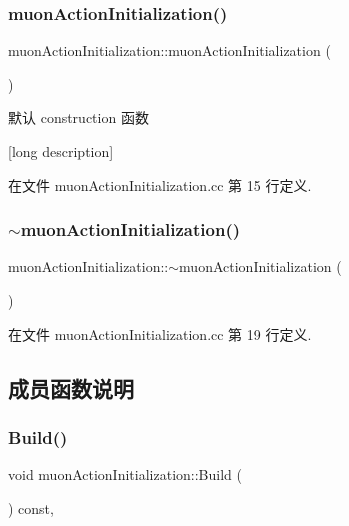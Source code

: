 \subsubsection{\texorpdfstring{muon\+Action\+Initialization()}{muonActionInitialization()}}
{\footnotesize\ttfamily muon\+Action\+Initialization\+::muon\+Action\+Initialization (\begin{DoxyParamCaption}{ }\end{DoxyParamCaption})}



默认 construction 函数 

\mbox{[}long description\mbox{]} 

在文件 muon\+Action\+Initialization.\+cc 第 15 行定义.

\mbox{\label{classmuonActionInitialization_af86f5507a8d33358f758e1ef65f73597}} 
\subsubsection{\texorpdfstring{$\sim$muon\+Action\+Initialization()}{~muonActionInitialization()}}
{\footnotesize\ttfamily muon\+Action\+Initialization\+::$\sim$muon\+Action\+Initialization (\begin{DoxyParamCaption}{ }\end{DoxyParamCaption})\hspace{0.3cm}{\ttfamily [virtual]}}



在文件 muon\+Action\+Initialization.\+cc 第 19 行定义.



\subsection{成员函数说明}
\mbox{\label{classmuonActionInitialization_afa2c061aba623bc3dcdf417188b17492}} 
\subsubsection{\texorpdfstring{Build()}{Build()}}
{\footnotesize\ttfamily void muon\+Action\+Initialization\+::\+Build (\begin{DoxyParamCaption}{ }\end{DoxyParamCaption}) const\hspace{0.3cm}{\ttfamily [override]}, {\ttfamily [virtual]}}



